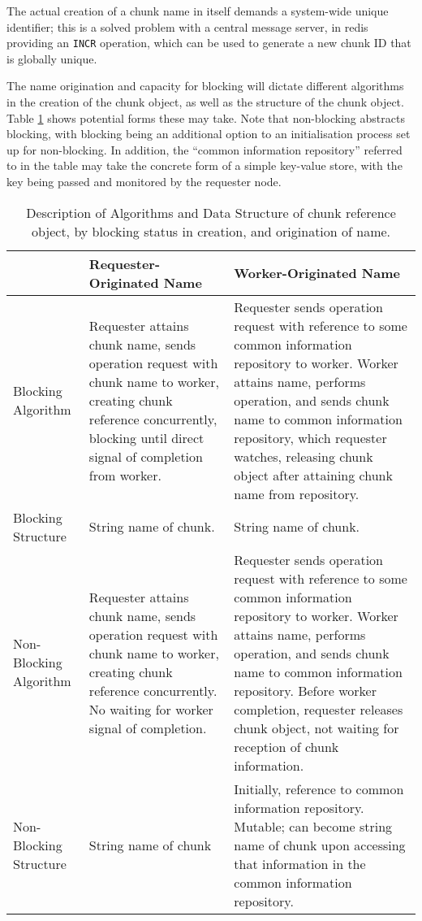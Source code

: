 \documentclass[a4paper,10pt]{article}
\begin{document}
The actual creation of a chunk name in itself demands a system-wide unique
identifier; this is a solved problem with a central message server, in redis
providing an \texttt{INCR} operation, which can be used to generate a new chunk
ID that is globally unique.

The name origination and capacity for blocking will dictate different
algorithms in the creation of the chunk object, as well as the structure of the
chunk object.
Table \ref{tab:name-orig-block} shows potential forms these may take.
Note that non-blocking abstracts blocking, with blocking being an additional
option to an initialisation process set up for non-blocking.
In addition, the ``common information repository'' referred to in the table may
take the concrete form of a simple key-value store, with the key being passed
and monitored by the requester node.

\begin{table}
	\centering
	\begin{tabularx}{\textwidth}{l|XX}
	\toprule
	& Requester-Originated Name & Worker-Originated Name \\
	\midrule
	Blocking Algorithm & 
		Requester attains chunk name, sends operation request with
		chunk name to worker, creating chunk reference concurrently,
		blocking until direct signal of completion from worker. & 
		Requester sends operation request with reference to some common
		information repository to worker. Worker attains name, performs
		operation, and sends chunk name to common information
		repository, which requester watches, releasing chunk object
		after attaining chunk name from repository. \\
	Blocking Structure & 
		String name of chunk. & 
		String name of chunk. \\
	Non-Blocking Algorithm & 
		Requester attains chunk name, sends operation request with
		chunk name to worker, creating chunk reference concurrently. No
		waiting for worker signal of completion. & 
		Requester sends operation request with reference to some common
		information repository to worker. Worker attains name, performs
		operation, and sends chunk name to common information
		repository. Before worker completion, requester releases chunk
		object, not waiting for reception of chunk information. \\
	Non-Blocking Structure & 
		String name of chunk &
		Initially, reference to common information repository. Mutable;
		can become string name of chunk upon accessing that information
		in the common information repository. \\
	\bottomrule
\end{tabularx}
	\caption{Description of Algorithms and Data Structure of chunk
	reference object, by blocking status in creation, and origination of
	name.}
	\label{tab:name-orig-block}
\end{table}
\end{document}

